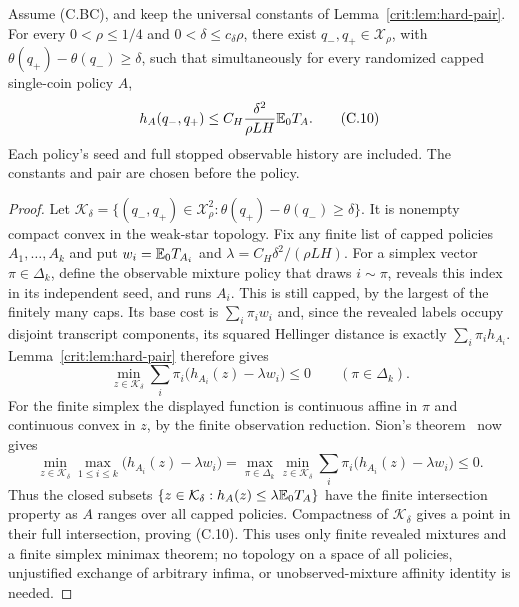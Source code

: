 \begin{lemma}\label{crit:lem:universal-pair}
Assume (C.BC), and keep the universal constants of
Lemma~\ref{crit:lem:hard-pair}. For every $0<\rho\le1/4$ and
$0<\delta\le c_\delta\rho$, there exist
$q_-,q_+\in\mathcal X_\rho$, with
$\theta(q_+)-\theta(q_-)\ge\delta$, such that simultaneously for every
randomized capped single-coin policy $A$,
\[
 h_A(q_-,q_+)\le C_H\frac{\delta^2}{\rho LH}\mathbb E_0T_A.       \tag{C.10}
\]
Each policy's seed and full stopped observable history are included.
The constants and pair are chosen before the policy.
\end{lemma}
\begin{proof}
Let $\mathcal K_\delta=\{(q_-,q_+)\in\mathcal X_\rho^2:
\theta(q_+)-\theta(q_-)\ge\delta\}$. It is nonempty compact convex in
the weak-star topology. Fix any finite list of capped policies
$A_1,\ldots,A_k$ and put $w_i=\mathbb E_0T_{A_i}$ and
$\lambda=C_H\delta^2/(\rho LH)$. For a simplex vector
$\pi\in\Delta_k$, define the observable mixture policy that draws
$i\sim\pi$, reveals this index in its independent seed, and runs $A_i$.
This is still capped, by the largest of the finitely many caps. Its
base cost is $\sum_i\pi_iw_i$ and, since the revealed labels occupy
disjoint transcript components, its squared Hellinger distance is exactly
$\sum_i\pi_i h_{A_i}$. Lemma~\ref{crit:lem:hard-pair} therefore gives
\[
 \min_{z\in\mathcal K_\delta}
       \sum_i\pi_i\big(h_{A_i}(z)-\lambda w_i\big)\le0
       \qquad(\pi\in\Delta_k).
\]
For the finite simplex the displayed function is continuous affine in
$\pi$ and continuous convex in $z$, by the finite observation reduction.
Sion's theorem~\cite{sion} now gives
\[
 \min_{z\in\mathcal K_\delta}
       \max_{1\le i\le k}\big(h_{A_i}(z)-\lambda w_i\big)
   =\max_{\pi\in\Delta_k}\min_{z\in\mathcal K_\delta}
       \sum_i\pi_i\big(h_{A_i}(z)-\lambda w_i\big)\le0.
\]
Thus the closed subsets
$\{z\in\mathcal K_\delta:h_A(z)\le\lambda\mathbb E_0T_A\}$
have the finite intersection property as $A$ ranges over all capped
policies. Compactness of $\mathcal K_\delta$ gives a point in their full
intersection, proving (C.10). This uses only finite revealed mixtures and
a finite simplex minimax theorem; no topology on a space of all policies,
unjustified exchange of arbitrary infima, or unobserved-mixture affinity
identity is needed.
\end{proof}




